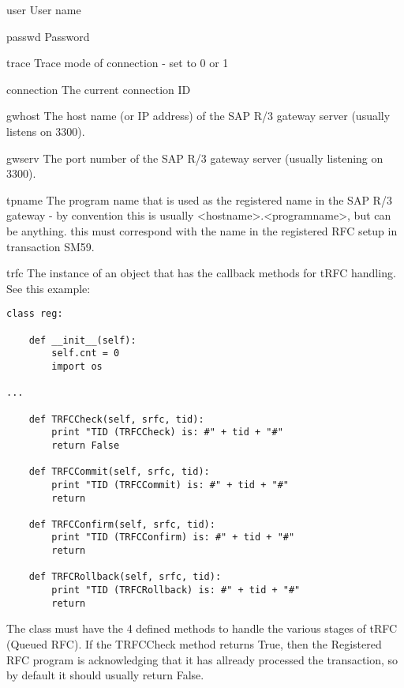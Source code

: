 \documentclass{howto}
\begin{document}
\begin{memberdesc}[conn]{user}
    User name
\end{memberdesc}

\begin{memberdesc}[conn]{passwd}
    Password
\end{memberdesc}

\begin{memberdesc}[conn]{trace}
    Trace mode of connection - set to 0 or 1
\end{memberdesc}

\begin{memberdesc}[conn]{connection}
    The current connection ID
\end{memberdesc}

\begin{memberdesc}[conn]{gwhost}
    The host name (or IP address) of the SAP R/3 gateway server (usually listens on 3300).
\end{memberdesc}

\begin{memberdesc}[conn]{gwserv}
    The port number of the SAP R/3 gateway server (usually listening on 3300).
\end{memberdesc}

\begin{memberdesc}[conn]{tpname}
    The program name that is used as the registered name in the SAP R/3 gateway - by convention this is usually <hostname>.<programname>, but can be anything.  this must correspond with the name in the registered RFC setup in transaction SM59.
\end{memberdesc}

\begin{memberdesc}[conn]{trfc}
    The instance of an object that has the callback methods for tRFC handling.  See this example:


\begin{verbatim}
class reg:

	def __init__(self):
		self.cnt = 0
		import os

...

	def TRFCCheck(self, srfc, tid):
		print "TID (TRFCCheck) is: #" + tid + "#"
		return False

	def TRFCCommit(self, srfc, tid):
		print "TID (TRFCCommit) is: #" + tid + "#"
		return

	def TRFCConfirm(self, srfc, tid):
		print "TID (TRFCConfirm) is: #" + tid + "#"
		return

	def TRFCRollback(self, srfc, tid):
		print "TID (TRFCRollback) is: #" + tid + "#"
		return
\end{verbatim}

The class must have the 4 defined methods to handle the various stages of tRFC (Queued RFC).  If the TRFCCheck method returns True, then the Registered RFC program is acknowledging that it has allready processed the transaction, so by default it should usually return False.

\end{memberdesc}
\end{document}
